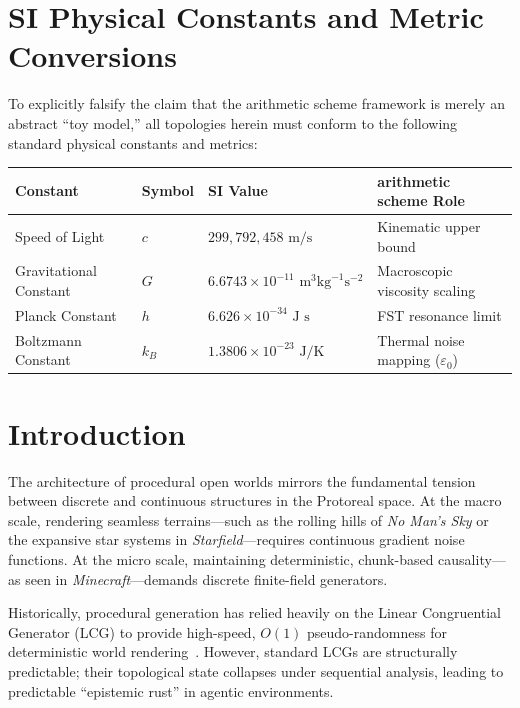 \section*{SI Physical Constants and Metric Conversions}
To explicitly falsify the claim that the arithmetic scheme framework is merely an abstract ``toy model,'' all topologies herein must conform to the following standard physical constants and metrics:
\begin{table}[ht]
\centering
\renewcommand{\arraystretch}{1.2}
\begin{tabular}{@{}llll@{}}
\toprule
\textbf{Constant} & \textbf{Symbol} & \textbf{SI Value} & \textbf{arithmetic scheme Role} \\
\midrule
Speed of Light & $c$ & $299,792,458 \text{ m/s}$ & Kinematic upper bound \\
Gravitational Constant & $G$ & $6.6743 \times 10^{-11} \text{ m}^3 \text{kg}^{-1} \text{s}^{-2}$ & Macroscopic viscosity scaling \\
Planck Constant & $h$ & $6.626 \times 10^{-34} \text{ J s}$ & FST resonance limit \\
Boltzmann Constant & $k_B$ & $1.3806 \times 10^{-23} \text{ J/K}$ & Thermal noise mapping ($\varepsilon_0$) \\
\bottomrule
\end{tabular}
\end{table}

\section{Introduction}

The architecture of procedural open worlds mirrors the fundamental tension between discrete and continuous structures in the Protoreal space. At the macro scale, rendering seamless terrains---such as the rolling hills of \textit{No Man's Sky} or the expansive star systems in \textit{Starfield}---requires continuous gradient noise functions. At the micro scale, maintaining deterministic, chunk-based causality---as seen in \textit{Minecraft}---demands discrete finite-field generators. 

Historically, procedural generation has relied heavily on the Linear Congruential Generator (LCG) to provide high-speed, $O(1)$ pseudo-randomness for deterministic world rendering~\cite{persson_minecraft}. However, standard LCGs are structurally predictable; their topological state collapses under sequential analysis, leading to predictable ``epistemic rust'' in agentic environments. 


